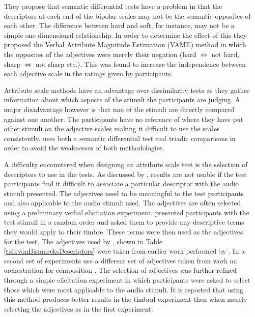 			They propose that semantic differential tests have a problem in that the descriptors at each end of
			the bipolar scales may not be the semantic opposites of each other. The difference between hard and
			soft, for instance, may not be a simple one dimensional relationship. In order to determine the
			effect of this they proposed the Verbal Attribute Magnitude Estimation (VAME) method in which the
			opposites of the adjectives were merely their negation (hard $\Leftrightarrow$ not hard, sharp
			$\Leftrightarrow$ not sharp etc.). This was found to increase the independence between each
			adjective scale in the ratings given by participants. 

			Attribute scale methods have an advantage over dissimilarity tests as they gather information about
			which aspects of the stimuli the participants are judging. A major disadvantage however is that non
			of the stimuli are directly compared against one another. The participants have no reference of
			where they have put other stimuli on the adjective scales making it difficult to use the scales
			consistently. \citet{marui2005constructing} uses both a semantic differential test and triadic
			comparisons in order to avoid the weaknesses of both methodologies. 

			A difficulty encountered when designing an attribute scale test is the selection of descriptors to
			use in the tests. As discussed by \citet{darke2005assessment}, results are not usable if the test
			participants find it difficult to associate a particular descriptor with the audio stimuli
			presented. The adjectives need to be meaningful to the test participants and also applicable to the
			audio stimuli used. The adjectives are often selected using a preliminary verbal elicitation
			experiment. \citet{namba1991verbal} presented participants with the test stimuli in a random order
			and asked them to provide any descriptive terms they would apply to their timbre. These terms were
			then used as the adjectives for the test. The adjectives used by \citet{kendall1993verbal1}, shown
			in Table \ref{tab:vonBismarcksDescriptors} were taken from earlier work performed by
			\citet{vonbismarck1974timbre}. In a second set of experiments \citet{kendall1993verbal2} use a
			different set of adjectives taken from work on orchestration for composition
			\citet{piston1955orchestration}. The selection of adjectives was further refined through a simple
			elicitation experiment in which participants were asked to select those which were most applicable
			to the audio stimuli. It is reported that using this method produces better results in the timbral
			experiment then when merely selecting the adjectives as in the first experiment.

